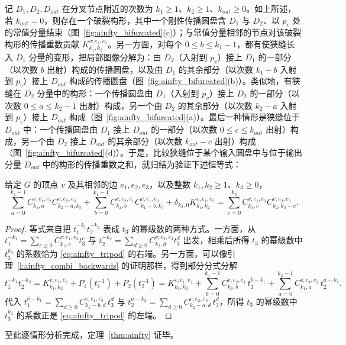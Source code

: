 记 $D_1,D_2,D_{out}$ 在分叉节点附近的次数为 $k_1\geq 1$、$k_2\geq 1$、$k_{out}\geq 0$。如上所述，若 $k_{out}=0$，则存在一个破裂构形，其中一个刚性传播圆盘含 $D_1$ 与 $D_2$、以 $p_v$ 处的常值分量结束（图~\ref{fig:ainfty_bifurcated}(c)）；与常值分量相邻的节点对该破裂构形的传播重数贡献 $K^{v;e_1,e_2}_{k_1,k_2}$。另一方面，对每个 $0\leq b\leq k_1-1$，都有使狭缝长入 $D_1$ 分量的变形，把局部图像分解为：由 $D_2$（入射到 $p_v$）接上 $D_1$ 的一部分（以次数 $b$ 出射）构成的传播圆盘，以及由 $D_1$ 的其余部分（以次数 $k_1-b$ 入射到 $p_v$）接上 $D_{out}$ 构成的传播圆盘（图~\ref{fig:ainfty_bifurcated}(b)）。类似地，有狭缝在 $D_2$ 分量中的构形：一个传播圆盘由 $D_1$（入射到 $p_v$）接上 $D_2$ 的一部分（以次数 $0\leq a\leq k_2-1$ 出射）构成，另一个由 $D_2$ 的其余部分（以次数 $k_2-a$ 入射到 $p_v$）接上 $D_{out}$ 构成（图~\ref{fig:ainfty_bifurcated}(a)）。最后一种情形是狭缝位于 $D_{out}$ 中：一个传播圆盘由 $D_1$ 接上 $D_{out}$ 的一部分（以次数 $0\leq c\leq k_{out}$ 出射）构成，另一个由 $D_2$ 接上 $D_{out}$ 的其余部分（以次数 $k_{out}-c$ 出射）构成（图~\ref{fig:ainfty_bifurcated}(d)）。于是，比较狭缝位于某个输入圆盘中与位于输出分量 $D_{out}$ 中的构形的传播重数之和，就归结为验证下述恒等式：

\begin{lemma}\label{l:ainfty_tripod}
给定 $G$ 的顶点 $v$ 及其相邻的边 $e_1,e_2,e_3$，以及整数 $k_1,k_2\geq 1$、$k_3\geq 0$，
\begin{equation}\label{eq:ainfty_tripod}
\sum_{a=0}^{k_2-1} C_{k_1,a}^{v;e_1,e_2} C_{k_2-a,k_3}^{v;e_2,e_3}
+\sum_{b=0}^{k_1-1} C_{k_2,b}^{v;e_2,e_1} C_{k_1-b,k_3}^{v;e_1,e_3}
+\delta_{k_3,0}K_{k_1,k_2}^{v;e_1,e_2}=
\sum_{c=0}^{k_3} C_{k_1,c}^{v;e_1,e_3} C_{k_2,k_3-c}^{v;e_2,e_3}.
\end{equation}
\end{lemma}

\begin{proof}
等式来自把 $t_1^{-k_1}t_2^{-k_2}$ 表成 $t_3$ 的幂级数的两种方式。一方面，从 $t_1^{-k_1}=\sum_{c\geq 0} C_{k_1,c}^{v;e_1,e_3} t_3^c$ 与 $t_2^{-k_2}=\sum_{d\geq 0} C_{k_2,d}^{v;e_2,e_3} t_3^d$ 出发，相乘后所得 $t_3$ 的幂级数中 $t_3^{k_3}$ 的系数恰为 \eqref{eq:ainfty_tripod} 的右端。另一方面，可以像引理~\ref{l:ainfty_combi_backwards} 的证明那样，得到部分分式分解
\begin{equation}\label{eq:partialproduct}
t_1^{-k_1}t_2^{-k_2}=K_{k_1,k_2}^{v;e_1,e_2}+P_1(t_1^{-1})+P_2(t_2^{-1})=
K_{k_1,k_2}^{v;e_1,e_2}+\sum_{b=0}^{k_1-1} C_{k_2,b}^{v;e_2,e_1}\,t_1^{b-k_1}
+\sum_{a=0}^{k_2-1} C_{k_1,a}^{v;e_1,e_2}\,t_2^{a-k_2}.
\end{equation}
代入 $t_1^{b-k_1}=\sum_{d\geq 0} C_{k_1-b,d}^{v;e_1,e_3}\, t_3^d$ 与 $t_2^{a-k_2}=\sum_{d\geq 0} C_{k_2-a,d}^{v;e_2,e_3}\, t_3^d$，所得 $t_3$ 的幂级数中 $t_3^{k_3}$ 的系数正是 \eqref{eq:ainfty_tripod} 的左端。
\end{proof}

至此逐情形分析完成，定理~\ref{thm:ainfty} 证毕。
